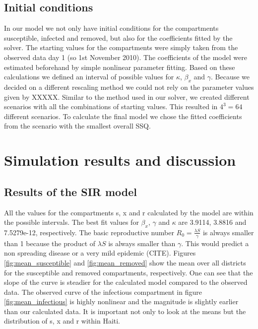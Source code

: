 \documentclass[11pt]{article}
\begin{document}
\subsection{Initial conditions}
\label{sec:initial conditions}
In our model we not only have initial conditions for the compartments susceptible, infected and removed, but also for the coefficients fitted by the solver. The starting values for the compartments were simply taken from the observed data day 1 (so 1st November 2010). The coefficients of the model were estimated beforehand by simple nonlinear parameter fitting. Based on these calculations we defined an interval of possible values for $\kappa$, $\beta_{x}$ and $\gamma$. Because we decided on a different rescaling method we could not rely on the parameter values given by XXXXX. Similar to the method used in our solver, we created different scenarios with all the combinations of starting values. This resulted in $4^{3}=64$ different scenarios. To calculate the final model we chose the fitted coefficients from the scenario with the smallest overall SSQ.





\section{Simulation results and discussion}
\subsection{Results of the SIR model}
All the values for the compartments s, x and r calculated by the model are within the possible intervals. The best fit values for $\beta_{x}$, $\gamma$ and $\kappa$ are 3.9114, 3.8816 and 7.5279e-12, respectively. The basic reproductive number $R_{0} = \frac{\lambda S}{\gamma}$ is always smaller than 1 because the product of $\lambda S$ is always smaller than $\gamma$. This would predict a non spreading disease or a very mild epidemic (CITE). Figures \ref{fig:mean_susceptible} and \ref{fig:mean_removed} show the mean over all districts for the susceptible and removed compartments, respectively. One can see that the slope of the curve is steadier for the calculated model compared to the observed data. The observed curve of the infectious compartment in figure \ref{fig:mean_infectious} is highly nonlinear and the magnitude is slightly earlier than our calculated data. It is important not only to look at the means but the distribution of s, x and r within Haiti.\\
\end{document}
